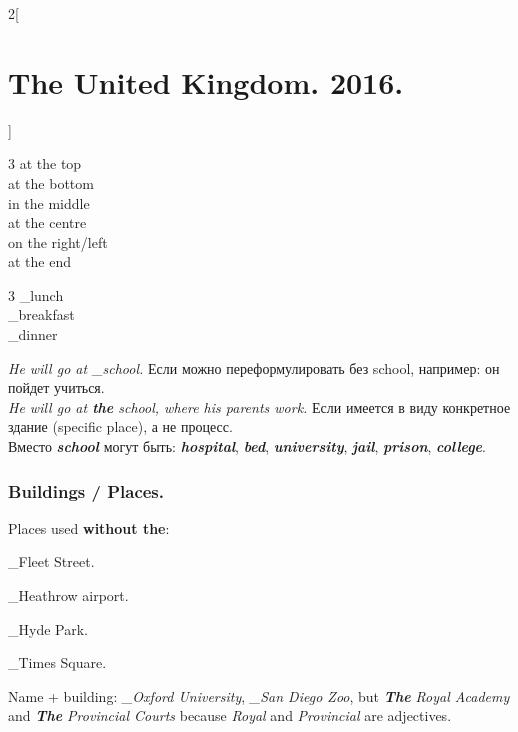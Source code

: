 \documentclass[10pt,a4paper]{article}
\newcommand\ex[1]{\textit{\textbf{{#1}}}}           %
\newcommand\za{\_\thinspace }                       %
\begin{document}
\begin{multicols}{2}[\section{The United Kingdom. 2016.}]
\begin{multicols}{3}
at the top\\
at the bottom\\
in the middle\\
at the centre\\
on the right/left\\
at the end
\end{multicols}

\begin{multicols}{3}
\za lunch\\
\za breakfast\\
\za dinner
\end{multicols}

\textit{He will go at \za school.} Если можно переформулировать без school, например: он пойдет учиться.\\
\textit{He will go at \textbf{the} school, where his parents work.} Если имеется в виду конкретное
здание (specific place), а не процесс.\\
Вместо \ex{school} могут быть: \ex{hospital}, \ex{bed}, \ex{university}, \ex{jail}, \ex{prison}, \ex{college}.



\subsubsection{Buildings / Places.}
Places used \textbf{without the}:
\begin{description}[leftmargin=2.9cm,style=nextline,before={\renewcommand\makelabel[1]{##1:}}]
  \item[Streets, roads] \za Fleet Street.
  \item[Airports] \za Heathrow airport.
  \item[Parks] \za Hyde Park.
  \item[Squares] \za Times Square.
\end{description}
\vspace{-\parskip}
Name + building: \textit{\za Oxford University}, \textit{\za San Diego Zoo}, but \textit{\ex{The} Royal Academy}
and \textit{\ex{The} Provincial Courts} because \textit{Royal} and \textit{Provincial} are adjectives.





\end{multicols}
\end{document}
